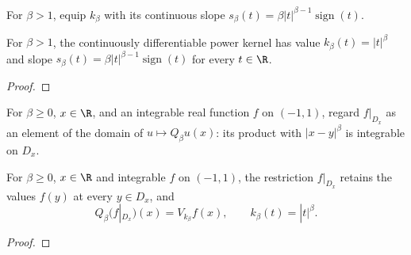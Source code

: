 \begin{supporting}
\begin{definition}
\label{def:c1-power-kernel}
\leanok
For $\beta>1$, equip $k_\beta$ with its continuous slope
$s_\beta(t)=\beta|t|^{\beta-1}\operatorname{sign}(t)$.
\end{definition}
\begin{theorem}
\label{thm:c1-power-kernel}
\leanok
For $\beta>1$, the continuously differentiable power kernel has value
$k_\beta(t)=|t|^\beta$ and slope
$s_\beta(t)=\beta|t|^{\beta-1}\operatorname{sign}(t)$ for every $t\in\R$.
\end{theorem}
\begin{proof}
\leanok
\end{proof}

\begin{definition}
\label{def:power-law-l1-input}
\leanok
For $\beta\ge0$, $x\in\R$, and an integrable real function $f$ on $(-1,1)$, regard $f|_{D_x}$ as an element of the domain of $u\mapsto Q_\beta u(x)$: its product with $|x-y|^\beta$ is integrable on $D_x$.
\end{definition}
\begin{theorem}
\label{thm:power-law-l1-input}
\leanok
For $\beta\ge0$, $x\in\R$ and integrable $f$ on $(-1,1)$, the restriction
$f|_{D_x}$ retains the values $f(y)$ at every $y\in D_x$, and
\[
 Q_\beta(f|_{D_x})(x)=V_{k_\beta}f(x),\qquad k_\beta(t)=|t|^\beta.
\]
\end{theorem}
\begin{proof}
\leanok
\end{proof}
\end{supporting}


